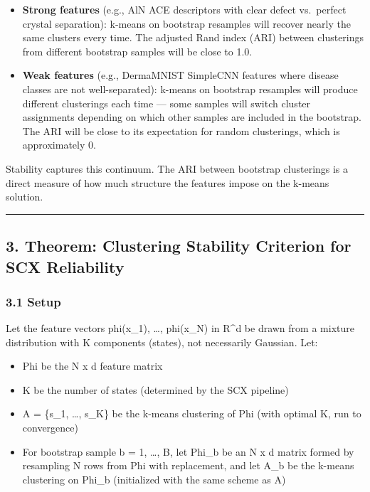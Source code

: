 \documentclass[
  12pt,
]{article}
\providecommand{\tightlist}{%
  \setlength{\itemsep}{0pt}\setlength{\parskip}{0pt}}
\begin{document}
\begin{itemize}
\item
  \textbf{Strong features} (e.g., AlN ACE descriptors with clear defect
  vs.~perfect crystal separation): k-means on bootstrap resamples will
  recover nearly the same clusters every time. The adjusted Rand index
  (ARI) between clusterings from different bootstrap samples will be
  close to 1.0.
\item
  \textbf{Weak features} (e.g., DermaMNIST SimpleCNN features where
  disease classes are not well-separated): k-means on bootstrap
  resamples will produce different clusterings each time --- some
  samples will switch cluster assignments depending on which other
  samples are included in the bootstrap. The ARI will be close to its
  expectation for random clusterings, which is approximately 0.
\end{itemize}

Stability captures this continuum. The ARI between bootstrap clusterings
is a direct measure of how much structure the features impose on the
k-means solution.

\begin{center}\rule{0.5\linewidth}{0.5pt}\end{center}

\subsection{3. Theorem: Clustering Stability Criterion for SCX
Reliability}\label{theorem-clustering-stability-criterion-for-scx-reliability}

\subsubsection{3.1 Setup}\label{setup}

Let the feature vectors phi(x\_1), \ldots, phi(x\_N) in R\^{}d be drawn
from a mixture distribution with K components (states), not necessarily
Gaussian. Let:

\begin{itemize}
\tightlist
\item
  Phi be the N x d feature matrix
\item
  K be the number of states (determined by the SCX pipeline)
\item
  A = \{s\_1, \ldots, s\_K\} be the k-means clustering of Phi (with
  optimal K, run to convergence)
\item
  For bootstrap sample b = 1, \ldots, B, let Phi\_b be an N x d matrix
  formed by resampling N rows from Phi with replacement, and let A\_b be
  the k-means clustering on Phi\_b (initialized with the same scheme as
  A)
\end{itemize}
\end{document}
